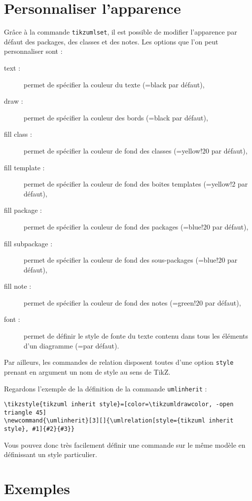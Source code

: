 \documentclass[a4paper,11pt]{report}
\begin{document}
\section{Personnaliser l'apparence}

Grâce à la commande {\tt tikzumlset}, il est possible de modifier l'apparence par défaut des packages, des classes et des notes. Les options que l'on peut personnaliser sont :

\begin{description}
\item[text : ] permet de spécifier la couleur du texte (=black par défaut),
\item[draw :] permet de spécifier la couleur des bords (=black par défaut),
\item[fill class :] permet de spécifier la couleur de fond des classes (=yellow!20 par défaut),
\item[fill template :] permet de spécifier la couleur de fond des boites templates (=yellow!2 par défaut),
\item[fill package :] permet de spécifier la couleur de fond des packages (=blue!20 par défaut),
\item[fill subpackage :] permet de spécifier la couleur de fond des sous-packages (=blue!20 par défaut),
\item[fill note :] permet de spécifier la couleur de fond des notes (=green!20 par défaut),
\item[font :] permet de définir le style de fonte du texte contenu dans tous les éléments d'un diagramme (=\small par défaut).
\end{description}

Par ailleurs, les commandes de relation disposent toutes d'une option {\tt style} prenant en argument un nom de style au sens de TikZ.

Regardons l'exemple de la définition de la commande {\tt umlinherit} :

\begin{lstlisting}
\tikzstyle{tikzuml inherit style}=[color=\tikzumldrawcolor, -open triangle 45]
\newcommand{\umlinherit}[3][]{\umlrelation[style={tikzuml inherit style}, #1]{#2}{#3}}
\end{lstlisting}

Vous pouvez donc très facilement définir une commande sur le même modèle en définissant un style particulier.

\section{Exemples}
\end{document}
